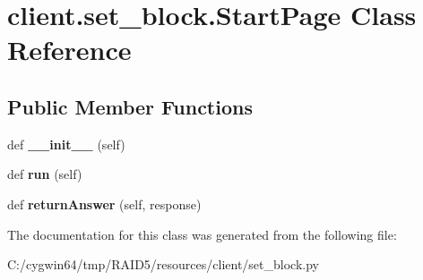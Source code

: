 \hypertarget{classclient_1_1set__block_1_1_start_page}{}\section{client.\+set\+\_\+block.\+Start\+Page Class Reference}
\label{classclient_1_1set__block_1_1_start_page}
\subsection*{Public Member Functions}
\begin{DoxyCompactItemize}
\item 
\mbox{\label{classclient_1_1set__block_1_1_start_page_ad3a0f6a148cc025886a27019b41d7639}} 
def {\bfseries \+\_\+\+\_\+init\+\_\+\+\_\+} (self)
\item 
\mbox{\label{classclient_1_1set__block_1_1_start_page_aee8f32301a29d5bca44fd782ec14e49c}} 
def {\bfseries run} (self)
\item 
\mbox{\label{classclient_1_1set__block_1_1_start_page_a2c3eb3a71a6ca0d78b4622ec6a75be4c}} 
def {\bfseries return\+Answer} (self, response)
\end{DoxyCompactItemize}


The documentation for this class was generated from the following file\+:\begin{DoxyCompactItemize}
\item 
C\+:/cygwin64/tmp/\+R\+A\+I\+D5/resources/client/set\+\_\+block.\+py\end{DoxyCompactItemize}
